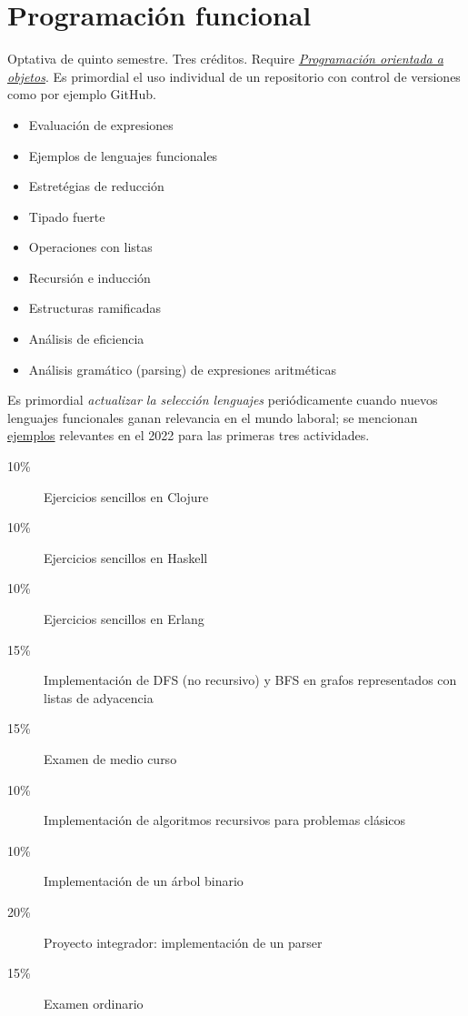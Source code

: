 \documentclass{article}
\begin{document}
\begin{multicols}{4}
\vfill\null \columnbreak

\hypertarget{pf}{\section*{Programaci\'{o}n funcional}}

Optativa de quinto semestre. Tres cr\'{e}ditos. Require
\hyperlink{poao}{\em Programaci\'{o}n orientada a objetos}. Es
primordial el uso individual de un repositorio con control de
versiones como por ejemplo GitHub.

\begin{itemize}
\item{Evaluaci\'{o}n de expresiones}
\item{Ejemplos de lenguajes funcionales}
\item{Estret\'{e}gias de reducci\'{o}n}
\item{Tipado fuerte}
\item{Operaciones con listas}
\item{Recursi\'{o}n e inducci\'{o}n}
\item{Estructuras ramificadas}
\item{An\'{a}lisis de eficiencia}
\item{An\'{a}lisis gram\'{a}tico (parsing) de expresiones aritm\'{e}ticas}
\end{itemize}

Es primordial {\em actualizar la selecci\'{o}n lenguajes} peri\'{o}dicamente
cuando nuevos lenguajes funcionales ganan relevancia en el mundo
laboral; se mencionan \underline{ejemplos} relevantes en el 2022 para
las primeras tres actividades.

\begin{description}
\item[10\%]{Ejercicios sencillos en Clojure}
\item[10\%]{Ejercicios sencillos en Haskell}
\item[10\%]{Ejercicios sencillos en Erlang}  
\item[15\%]{Implementaci\'{o}n de DFS (no recursivo) y BFS en grafos representados con listas de adyacencia}  
\item[15\%]{Examen de medio curso}
\item[10\%]{Implementaci\'{o}n de algoritmos recursivos para problemas
  cl\'{a}sicos}
\item[10\%]{Implementaci\'{o}n de un \'{a}rbol binario}
\item[20\%]{Proyecto integrador: implementaci\'{o}n de un parser}
\item[15\%]{Examen ordinario}
\end{description}  


\end{multicols}
\end{document}
